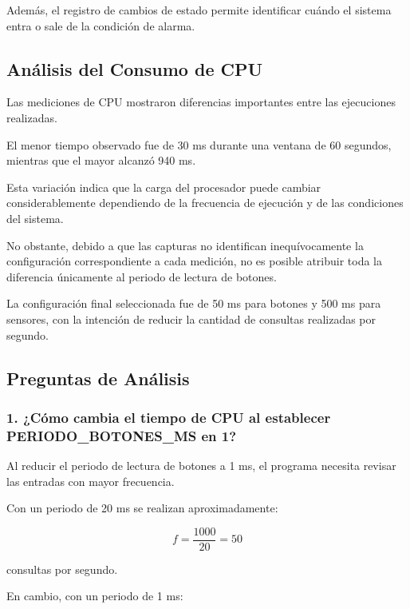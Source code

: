 \documentclass[conference]{IEEEtran}
\begin{document}
Además, el registro de cambios de estado permite identificar cuándo el sistema entra o sale de la condición de alarma.

\subsection{Análisis del Consumo de CPU}

Las mediciones de CPU mostraron diferencias importantes entre las ejecuciones realizadas.

El menor tiempo observado fue de 30 ms durante una ventana de 60 segundos, mientras que el mayor alcanzó 940 ms.

Esta variación indica que la carga del procesador puede cambiar considerablemente dependiendo de la frecuencia de ejecución y de las condiciones del sistema.

No obstante, debido a que las capturas no identifican inequívocamente la configuración correspondiente a cada medición, no es posible atribuir toda la diferencia únicamente al periodo de lectura de botones.

La configuración final seleccionada fue de 50 ms para botones y 500 ms para sensores, con la intención de reducir la cantidad de consultas realizadas por segundo.


\subsection{Preguntas de Análisis}

\subsubsection{1. ¿Cómo cambia el tiempo de CPU al establecer PERIODO\_BOTONES\_MS en 1?}

Al reducir el periodo de lectura de botones a 1 ms, el programa necesita revisar las entradas con mayor frecuencia.

Con un periodo de 20 ms se realizan aproximadamente:

\begin{equation}
f = \frac{1000}{20}=50
\end{equation}

consultas por segundo.

En cambio, con un periodo de 1 ms:
\end{document}

